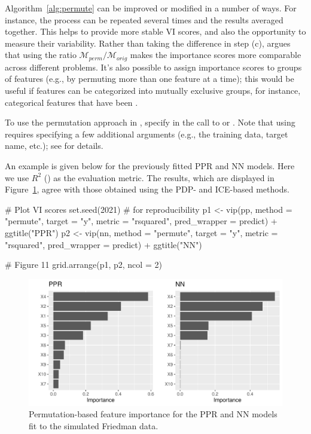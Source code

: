 Algorithm~\ref{alg:permute} can be improved or modified in a number of ways. For instance, the process can be repeated several times and the results averaged together. This helps to provide more stable VI scores, and also the opportunity to measure their variability. Rather than taking the difference in step (c), \citet[Chapter 5, Section 5.5.4]{molnar-2019-iml} argues that using the ratio $\mathcal{M}_{perm} / \mathcal{M}_{orig}$ makes the importance scores more comparable across different problems. It's also possible to assign importance scores to groups of features (e.g., by permuting more than one feature at a time); this would be useful if features can be categorized into mutually exclusive groups, for instance, categorical features that have been .

To use the permutation approach in , specify  in the call to  or . Note that using  requires specifying a few additional arguments (e.g., the training data, target name, etc.); see  for details.

An example is given below for the previously fitted PPR and NN models. Here we use $R^2$ () as the evaluation metric. The results, which are displayed in Figure~\ref{fig:vip-permute-ppr-nn}, agree with those obtained using the PDP- and ICE-based methods.

\begin{example}
# Plot VI scores
set.seed(2021)  # for reproducibility
p1 <- vip(pp, method = "permute", target = "y", metric = "rsquared",
          pred_wrapper = predict) + ggtitle("PPR")
p2 <- vip(nn, method = "permute", target = "y", metric = "rsquared",
          pred_wrapper = predict) + ggtitle("NN")

# Figure 11
grid.arrange(p1, p2, ncol = 2)
\end{example}

\begin{figure}[!htb]
  \centering 
  \includegraphics[width=1\linewidth]{figures/vip-permute-ppr-nn} 
  \caption{Permutation-based feature importance for the PPR and NN models fit to the simulated Friedman data.}
  \label{fig:vip-permute-ppr-nn}
\end{figure}

